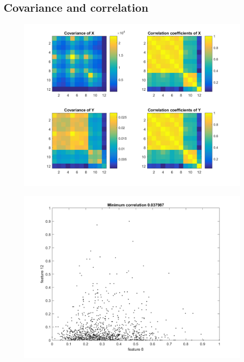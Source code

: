 \documentclass[a4paper,11pt]{article}
\begin{document}
\subsection{Covariance and correlation}
\begin{figure}[h]
  \begin{center}
    \includegraphics[width=\textwidth]{P2_2a}
    \caption{}
    \label{fig:P2_2a}
  \end{center}
\end{figure}
\begin{figure}[h]
  \begin{center}
    \includegraphics[width=\textwidth]{P2_2b}
    \caption{}
    \label{fig:P2_2b}
  \end{center}
\end{figure}
\end{document}
